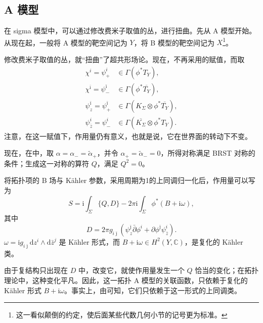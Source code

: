 \subsection{A 模型}\label{sec:3.4.1}

在 sigma 模型中，可以通过修改费米子取值的丛，进行扭曲。先从 A 模型开始。从现在起，一般将 A 模型的靶空间记为 $Y$，将 B 模型的靶空间记为 $X$\footnote{这一看似颠倒的约定，使后面某些代数几何小节的记号更为标准。}。

修改费米子取值的丛，就“扭曲”了超共形场论。现在，不再采用的赋值，而取
\begin{equation}\label{eq:3.115}
\begin{aligned}
\chi^i=\psi_+^i&\in\Gamma(\phi^*T_Y),\\
\chi^{\bar\imath}=\psi_-^{\bar\imath}
&\in\Gamma(\phi^*\overline{T_Y}),\\
\psi_z^{\bar\imath}=\psi_+^{\bar\imath}
&\in\Gamma(K_\Sigma\otimes\phi^*\overline{T_Y}),\\
\psi_{\bar z}^i=\psi_-^i
&\in\Gamma(\overline{K_\Sigma}\otimes\phi^*T_Y).
\end{aligned}
\end{equation}
注意，在这一赋值下，作用量仍有意义，也就是说，它在世界面的转动下不变。

现在，在中，取 $\alpha=\alpha_-=\widetilde\alpha_+$，并令 $\alpha_+=\widetilde\alpha_-=0$，所得对称满足 BRST 对称的条件；生成这一对称的算符 $Q$，满足 $Q^2=0$。

将拓扑项的 B 场与 K\"ahler 参数，采用周期为1的上同调归一化后，作用量可以写为
\begin{equation}\label{eq:3.116}
S=\mathrm{i}\int_\Sigma\{Q,D\}
-2\pi\mathrm{i}\int_\Sigma\phi^*(B+\mathrm{i}\omega),
\end{equation}
其中
\begin{equation}\label{eq:3.117}
D=2\pi g_{i\bar\jmath}
\left(\psi_z^{\bar\jmath}\bar\partial\phi^i
+\partial\phi^{\bar\jmath}\psi_{\bar z}^i\right).
\end{equation}
$\omega=\mathrm{i}g_{i\bar\jmath}\mathrm{d}z^i\wedge\mathrm{d}\bar z^j$ 是 K\"ahler 形式，而 $B+\mathrm{i}\omega\in H^2(Y,\mathbb{C})$，是复化的 K\"ahler 类。

由于复结构只出现在 $D$ 中，改变它，就使作用量发生一个 $Q$ 恰当的变化；在拓扑理论中，这种变化平凡。因此，这一拓扑 A 模型的关联函数，只依赖于复化的 K\"ahler 形式 $B+\mathrm{i}\omega$。事实上，由可知，它们只依赖于这一形式的上同调类。

